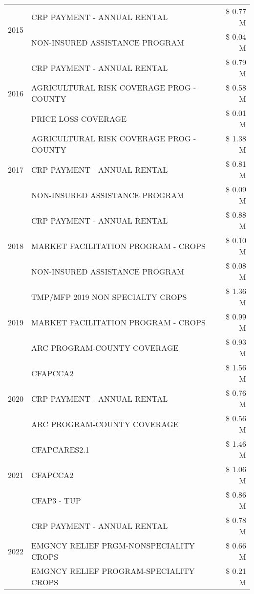 \begin{tabular}{llr}
\multirow[t]{2}{*}{2015} & CRP PAYMENT - ANNUAL RENTAL & \$ 0.77 M \\
 & NON-INSURED ASSISTANCE PROGRAM & \$ 0.04 M \\
\cline{1-3}
\multirow[t]{3}{*}{2016} & CRP PAYMENT - ANNUAL RENTAL & \$ 0.79 M \\
 & AGRICULTURAL RISK COVERAGE PROG - COUNTY & \$ 0.58 M \\
 & PRICE LOSS COVERAGE & \$ 0.01 M \\
\cline{1-3}
\multirow[t]{3}{*}{2017} & AGRICULTURAL RISK COVERAGE PROG - COUNTY & \$ 1.38 M \\
 & CRP PAYMENT - ANNUAL RENTAL & \$ 0.81 M \\
 & NON-INSURED ASSISTANCE PROGRAM & \$ 0.09 M \\
\cline{1-3}
\multirow[t]{3}{*}{2018} & CRP PAYMENT - ANNUAL RENTAL & \$ 0.88 M \\
 & MARKET FACILITATION PROGRAM - CROPS & \$ 0.10 M \\
 & NON-INSURED ASSISTANCE PROGRAM & \$ 0.08 M \\
\cline{1-3}
\multirow[t]{3}{*}{2019} & TMP/MFP 2019 NON SPECIALTY CROPS & \$ 1.36 M \\
 & MARKET FACILITATION PROGRAM - CROPS & \$ 0.99 M \\
 & ARC PROGRAM-COUNTY COVERAGE & \$ 0.93 M \\
\cline{1-3}
\multirow[t]{3}{*}{2020} & CFAPCCA2 & \$ 1.56 M \\
 & CRP PAYMENT - ANNUAL RENTAL & \$ 0.76 M \\
 & ARC PROGRAM-COUNTY COVERAGE & \$ 0.56 M \\
\cline{1-3}
\multirow[t]{3}{*}{2021} & CFAPCARES2.1 & \$ 1.46 M \\
 & CFAPCCA2 & \$ 1.06 M \\
 & CFAP3 - TUP & \$ 0.86 M \\
\cline{1-3}
\multirow[t]{3}{*}{2022} & CRP PAYMENT - ANNUAL RENTAL & \$ 0.78 M \\
 & EMGNCY RELIEF PRGM-NONSPECIALITY CROPS & \$ 0.66 M \\
 & EMGNCY RELIEF PROGRAM-SPECIALITY CROPS & \$ 0.21 M \\
\cline{1-3}
\bottomrule
\end{tabular}
